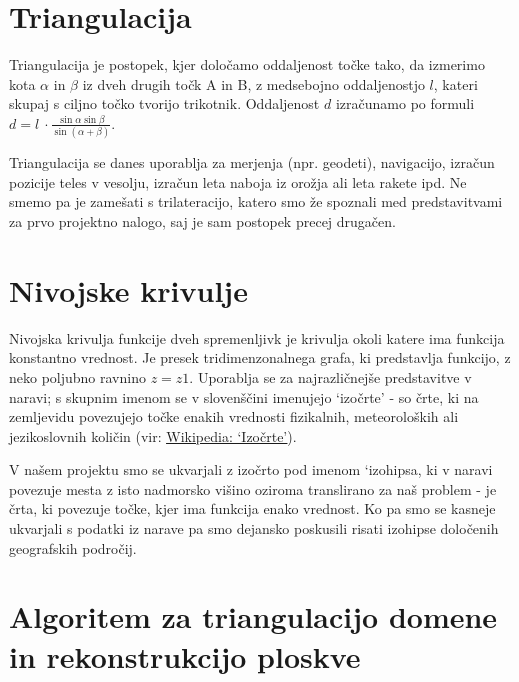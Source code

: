 \documentclass[a4paper,11pt]{article}
\begin{document}
\section{Triangulacija}

Triangulacija je postopek, kjer določamo oddaljenost točke tako, da izmerimo kota \(\alpha\) in \(\beta\) iz dveh drugih točk A in B, z medsebojno oddaljenostjo \(l\), kateri skupaj s ciljno točko tvorijo trikotnik. Oddaljenost \(d\) izračunamo po formuli
\( d = l\ \cdot \frac{\sin \alpha \sin \beta}{\sin(\alpha + \beta)}\).
\par
Triangulacija se danes uporablja za merjenja (npr. geodeti), navigacijo, izračun pozicije teles v vesolju, izračun leta naboja iz orožja ali leta rakete ipd. Ne smemo pa je zamešati s trilateracijo, katero smo že spoznali med predstavitvami za prvo projektno nalogo, saj je sam postopek precej drugačen.

\section{Nivojske krivulje}

Nivojska krivulja funkcije dveh spremenljivk je krivulja okoli katere ima funkcija konstantno vrednost. Je presek tridimenzonalnega grafa, ki predstavlja funkcijo, z neko poljubno ravnino \(z = z1\). Uporablja se za najrazličnejše predstavitve v naravi; s skupnim imenom se v slovenščini imenujejo `izočrte' - so črte, ki na zemljevidu povezujejo točke enakih vrednosti fizikalnih, meteoroloških ali jezikoslovnih količin (vir: \href{http://sl.wikipedia.org/wiki/Izo%C4%8Drte}{\underline{Wikipedia: `Izočrte'}}). \par
V našem projektu smo se ukvarjali z izočrto pod imenom `izohipsa, ki v naravi povezuje mesta z isto nadmorsko višino oziroma translirano za naš problem - je črta, ki povezuje točke, kjer ima funkcija enako vrednost. Ko pa smo se kasneje ukvarjali s podatki iz narave pa smo dejansko poskusili risati izohipse določenih geografskih področij.

\section{Algoritem za triangulacijo domene in rekonstrukcijo ploskve}
\end{document}

